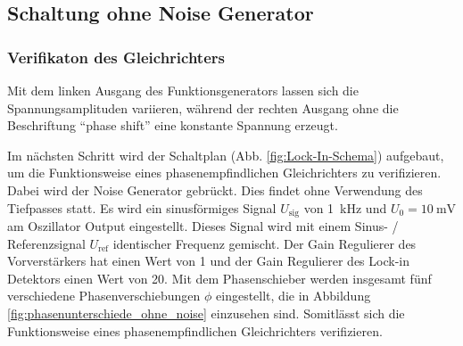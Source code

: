 %
%
%
%
%
%
\subsection{Schaltung ohne Noise Generator}
\label{sec:ohne_noise}
\subsubsection{Verifikaton des Gleichrichters}
\label{sec:gleichrichter}
Mit dem linken Ausgang des Funktionsgenerators lassen sich die Spannungsamplituden variieren,
während der rechten Ausgang ohne die Beschriftung \enquote{phase shift} eine konstante Spannung erzeugt.

\noindent
Im nächsten Schritt wird der Schaltplan (Abb. \ref{fig:Lock-In-Schema}) aufgebaut,
um die Funktionsweise eines phasenempfindlichen Gleichrichters zu verifizieren.
Dabei wird der Noise Generator gebrückt.
Dies findet ohne Verwendung des Tiefpasses statt.
Es wird ein sinusförmiges Signal $U_\text{sig}$ von \qty[]{1}{\kilo\hertz} und $U_0 = \qty[]{10}{\milli\volt}$ am Oszillator Output eingestellt.
Dieses Signal wird mit einem Sinus- / Referenzsignal $U_\text{ref}$ identischer Frequenz gemischt.
Der Gain Regulierer des Vorverstärkers hat einen Wert von 1 und der Gain Regulierer des Lock-in Detektors einen Wert von 20.
Mit dem Phasenschieber werden insgesamt fünf verschiedene Phasenverschiebungen $\phi$ eingestellt,
die in Abbildung \ref{fig:phasenunterschiede_ohne_noise} einzusehen sind.
Somitlässt sich die Funktionsweise eines phasenempfindlichen Gleichrichters verifizieren.
%
